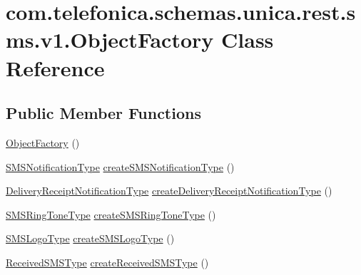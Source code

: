 \hypertarget{classcom_1_1telefonica_1_1schemas_1_1unica_1_1rest_1_1sms_1_1v1_1_1ObjectFactory}{
\section{com.telefonica.schemas.unica.rest.sms.v1.ObjectFactory Class Reference}
\label{classcom_1_1telefonica_1_1schemas_1_1unica_1_1rest_1_1sms_1_1v1_1_1ObjectFactory}
}
\subsection*{Public Member Functions}
\begin{DoxyCompactItemize}
\item 
\hyperlink{classcom_1_1telefonica_1_1schemas_1_1unica_1_1rest_1_1sms_1_1v1_1_1ObjectFactory_afd202c0f1bd572064decbfb68ee8fb2a}{ObjectFactory} ()
\item 
\hyperlink{classcom_1_1telefonica_1_1schemas_1_1unica_1_1rest_1_1sms_1_1v1_1_1SMSNotificationType}{SMSNotificationType} \hyperlink{classcom_1_1telefonica_1_1schemas_1_1unica_1_1rest_1_1sms_1_1v1_1_1ObjectFactory_a2107a0cebb2982464fa2af07206ce50c}{createSMSNotificationType} ()
\item 
\hyperlink{classcom_1_1telefonica_1_1schemas_1_1unica_1_1rest_1_1sms_1_1v1_1_1DeliveryReceiptNotificationType}{DeliveryReceiptNotificationType} \hyperlink{classcom_1_1telefonica_1_1schemas_1_1unica_1_1rest_1_1sms_1_1v1_1_1ObjectFactory_ab2bc34585be1f00022b2f3dea6d58177}{createDeliveryReceiptNotificationType} ()
\item 
\hyperlink{classcom_1_1telefonica_1_1schemas_1_1unica_1_1rest_1_1sms_1_1v1_1_1SMSRingToneType}{SMSRingToneType} \hyperlink{classcom_1_1telefonica_1_1schemas_1_1unica_1_1rest_1_1sms_1_1v1_1_1ObjectFactory_ab4118c69b3b59d03e5d5b793dbf4523d}{createSMSRingToneType} ()
\item 
\hyperlink{classcom_1_1telefonica_1_1schemas_1_1unica_1_1rest_1_1sms_1_1v1_1_1SMSLogoType}{SMSLogoType} \hyperlink{classcom_1_1telefonica_1_1schemas_1_1unica_1_1rest_1_1sms_1_1v1_1_1ObjectFactory_afaa5f67201f6b5e067791bdffbe8e474}{createSMSLogoType} ()
\item 
\hyperlink{classcom_1_1telefonica_1_1schemas_1_1unica_1_1rest_1_1sms_1_1v1_1_1ReceivedSMSType}{ReceivedSMSType} \hyperlink{classcom_1_1telefonica_1_1schemas_1_1unica_1_1rest_1_1sms_1_1v1_1_1ObjectFactory_acdafff612e1cdfbf76af68f31b8bd82d}{createReceivedSMSType} ()

\end{DoxyCompactItemize}
